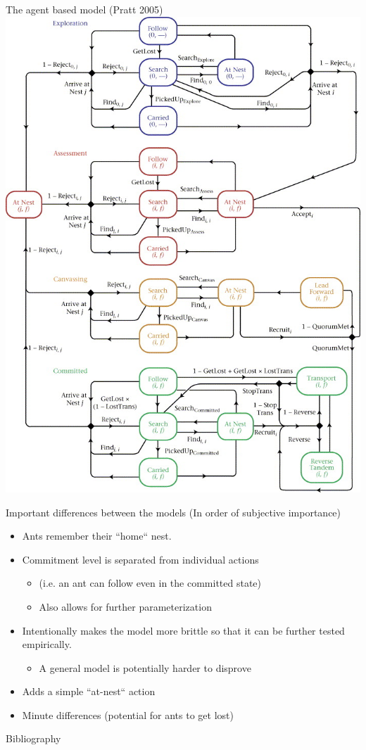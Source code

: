 \documentclass{beamer}
\newcommand{\sitem}[1]
{
    \begin{itemize}
        \item #1
    \end{itemize}
}
\begin{document}
  \begin{frame}{The agent based model (Pratt 2005)}
      \includegraphics[scale=1.6]{agent}
  \end{frame}

  \begin{frame}{Important differences between the models (In order of subjective importance)}
      \begin{itemize}
          \item Ants remember their ``home`` nest.
          \item Commitment level is separated from individual actions 
              \sitem{(i.e. an ant can follow even in the committed state)}
              \sitem{Also allows for further parameterization}
          \item Intentionally makes the model more brittle so that it can be further tested empirically. 
              \sitem{A general model is potentially harder to disprove}
          \item Adds a simple ``at-nest`` action 
          \item Minute differences (potential for ants to get lost)
      \end{itemize}
  \end{frame}

  \begin{frame}{Bibliography}
      
  \end{frame}
\end{document}
